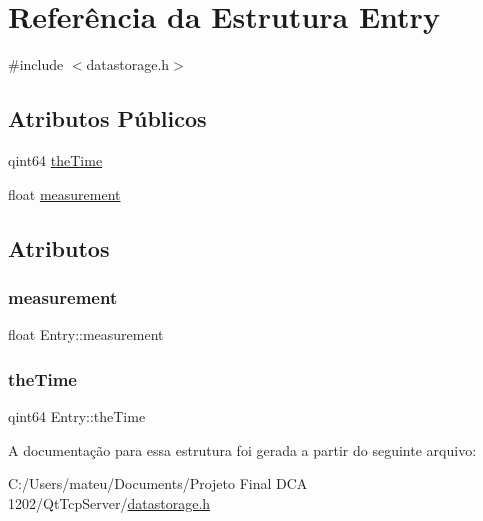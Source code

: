 \hypertarget{struct_entry}{}\section{Referência da Estrutura Entry}
\label{struct_entry}


{\ttfamily \#include $<$datastorage.\+h$>$}

\subsection*{Atributos Públicos}
\begin{DoxyCompactItemize}
\item 
qint64 \mbox{\hyperlink{struct_entry_a0a78d616ccc342ef6c34d849288d7c85}{the\+Time}}
\item 
float \mbox{\hyperlink{struct_entry_a78ebc6241b1baaa2551b2cf89f519960}{measurement}}
\end{DoxyCompactItemize}


\subsection{Atributos}
\mbox{\label{struct_entry_a78ebc6241b1baaa2551b2cf89f519960}} 
\subsubsection{\texorpdfstring{measurement}{measurement}}
{\footnotesize\ttfamily float Entry\+::measurement}

\mbox{\label{struct_entry_a0a78d616ccc342ef6c34d849288d7c85}} 
\subsubsection{\texorpdfstring{the\+Time}{theTime}}
{\footnotesize\ttfamily qint64 Entry\+::the\+Time}



A documentação para essa estrutura foi gerada a partir do seguinte arquivo\+:\begin{DoxyCompactItemize}
\item 
C\+:/\+Users/mateu/\+Documents/\+Projeto Final D\+C\+A 1202/\+Qt\+Tcp\+Server/\mbox{\hyperlink{datastorage_8h}{datastorage.\+h}}\end{DoxyCompactItemize}
